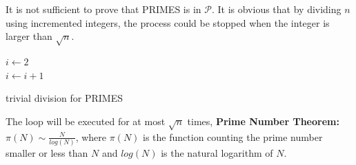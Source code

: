 \documentclass{assignment}
\begin{document}
    
    
    \begin{homeworkProblem}
    
    It is not sufficient to prove that PRIMES is in $\mathcal{P}$. It is obvious that by dividing $n$ using incremented integers, the process could be stopped when the integer is larger than $\sqrt{n}$.
    
         \begin{algorithm}[H]
 \BlankLine
$i \leftarrow 2$  \\
 {
 {}
$i \leftarrow i + 1$ \\
 }
\caption{trivial division for PRIMES} \end{algorithm}
 The loop will be executed for at most $\sqrt{n}$ times,
    \textbf{Prime Number Theorem:} $\pi (N) \sim  \frac{N}{log(N)}$, where $\pi (N)$ is the function counting the prime number smaller or less than $N$ and $log(N)$ is the natural logarithm of $N$. 
    \end{homeworkProblem}
    
\end{document}

